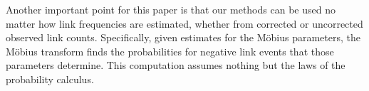 \documentclass[oribibl]{llncs}
\begin{document}
Another  important point for this paper is that our methods can be used no matter how link frequencies are estimated, whether from corrected or uncorrected observed link counts. Specifically, given estimates for the M\"obius parameters, the M\"obius transform finds the probabilities for negative link events that those parameters determine. This computation assumes nothing but the laws of the probability calculus. 




 
%
% 
\end{document}
